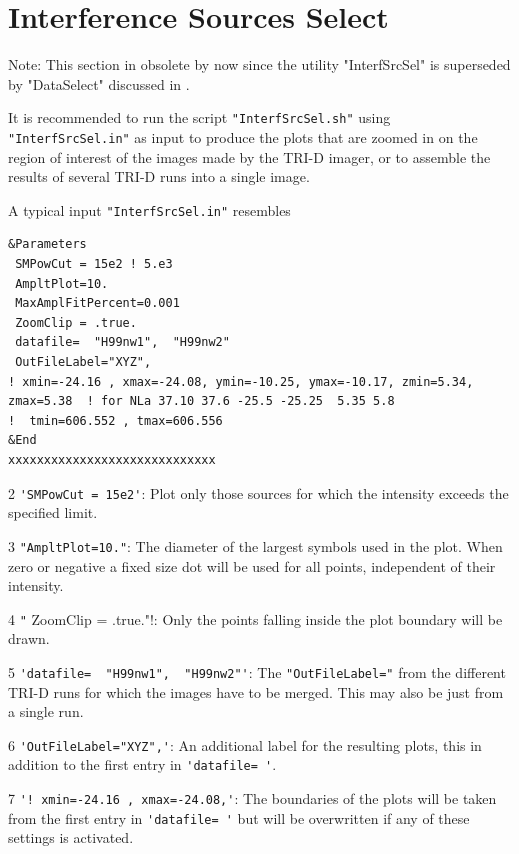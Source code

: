 
\section{Interference Sources Select}

Note: This section in obsolete by now since the utility "InterfSrcSel" is superseded by "DataSelect" discussed in .

It is recommended to run the script \verb!"InterfSrcSel.sh"! using \verb!"InterfSrcSel.in"! as input to produce the plots that are zoomed in on the region of interest of the images made by the TRI-D imager, or to assemble the results of several TRI-D runs into a single image.

A typical input \verb!"InterfSrcSel.in"! resembles

\begin{linenumbers}
\resetlinenumber
\begin{verbatim}
&Parameters
 SMPowCut = 15e2 ! 5.e3
 AmpltPlot=10.
 MaxAmplFitPercent=0.001
 ZoomClip = .true.
 datafile=  "H99nw1",  "H99nw2"
 OutFileLabel="XYZ",
! xmin=-24.16 , xmax=-24.08, ymin=-10.25, ymax=-10.17, zmin=5.34, zmax=5.38  ! for NLa 37.10 37.6 -25.5 -25.25  5.35 5.8
!  tmin=606.552 , tmax=606.556
&End
xxxxxxxxxxxxxxxxxxxxxxxxxxxxx
\end{verbatim}
\end{linenumbers}

\begin{enumerate*}
\item[2] \verb!'SMPowCut = 15e2'!: Plot only those sources for which the intensity exceeds the specified limit.
\item[3] \verb#"AmpltPlot=10."#: The diameter of the largest symbols used in the plot. When zero or negative a fixed size dot will be used for all points, independent of their intensity.
\item[4] \verb!"! ZoomClip = .true."!: Only the points falling inside the plot boundary will be drawn.
\item[5] \verb#'datafile=  "H99nw1",  "H99nw2"'#: The \verb!"OutFileLabel="! from the different TRI-D runs for which the images have to be merged. This may also be just from a single run.
\item[6] \verb#'OutFileLabel="XYZ",'#: An additional label for the resulting plots, this in addition to the first entry in \verb#'datafile= '#.
\item[7] \verb#'! xmin=-24.16 , xmax=-24.08,'#: The boundaries of the plots will be taken from the first entry in \verb#'datafile= '# but will be overwritten if any of these settings is activated.
\end{enumerate*}

